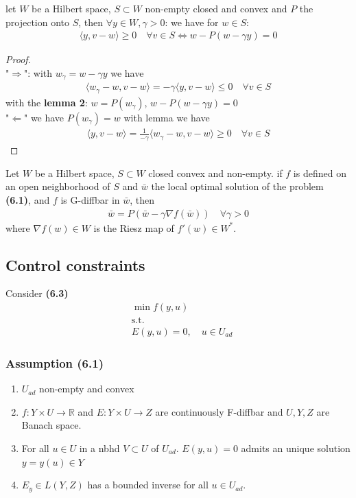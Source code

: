 \begin{lemma}
	let $W$ be a Hilbert space, $S \subset W$ non-empty closed and convex and $P$ the projection onto $S$, then $\forall y \in W, \gamma > 0$: we have for $w \in S:$
	\begin{align*}
		\langle y, v - w \rangle \geq 0 \quad \forall v \in S
		\Leftrightarrow w - P(w - \gamma y) = 0
	\end{align*}
\end{lemma}
\begin{proof}\quad\\
	"$\Rightarrow$": with $w_\gamma = w - \gamma y$ we have
	\begin{align*}
		\langle w_\gamma - w, v - w \rangle 
		= -\gamma \langle y, v - w \rangle 
		\le 0 \quad \forall v \in S
	\end{align*}
	with the \textbf{lemma 2}:  $w = P(w_\gamma)$, $ w - P(w - \gamma y) = 0$\\
	"$\Leftarrow$" we have $P(w_\gamma) = w$ with lemma we have
	\begin{align*}
		\langle y, v - w\rangle = \frac{1}{-\gamma}\langle w_\gamma - w, v - w \rangle \geq 0 \quad \forall v \in S
	\end{align*}
\end{proof}

\begin{corollary}
	Let $W$ be a Hilbert space, $S \subset W$ closed convex and non-empty. if $f$ is defined on an open neighborhood of $S$ and $\bar{w}$ the local optimal solution of the problem \textbf{(6.1)}, and $f$ is G-diffbar in $\bar{w}$, then
	\begin{align*}
		\bar{w} = P(\bar{w} - \gamma \nabla f(\bar{w})) \quad \forall \gamma > 0
	\end{align*}
	where $\nabla f(w) \in W$ is the Riesz map of $f'(w) \in W^*$. 
\end{corollary}


\subsection{Control constraints}
Consider \textbf{(6.3)}
\begin{align*}
	& \min f(y, u) \\
	& \text{s.t.}\\
	&  E(y, u) = 0, \quad u \in U_{ad}
\end{align*}

\subsubsection*{Assumption (6.1)}
\begin{enumerate}
	\item $U_{ad}$ non-empty and convex
	\item $f: Y \times U \rightarrow \mathbb{R}$ and $E: Y \times U \rightarrow Z$ are continuously F-diffbar and $U, Y, Z$ are Banach space. 
	\item For all $u \in U$ in a nbhd $V \subset U$ of $U_{ad}$. $E(y, u) = 0$ admits an unique solution $y =y(u) \in Y$
	\item $E_y \in L(Y, Z)$ has a bounded inverse for all $u \in U_{ad}$. 
\end{enumerate}

